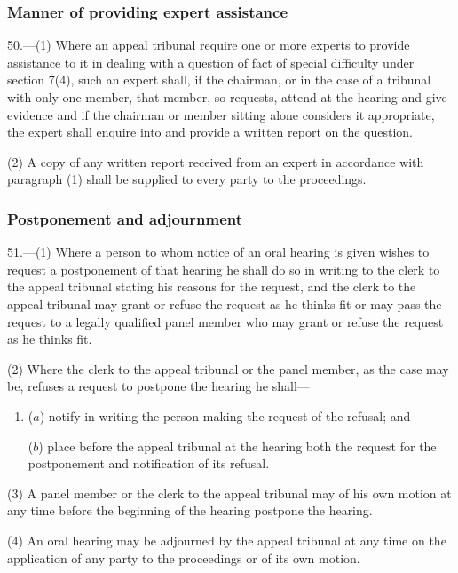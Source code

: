 \documentclass[12pt,a4paper]{article}
\begin{document}
\subsubsection[50. Manner of providing expert assistance]{Manner of providing expert assistance}

50.—(1) Where an appeal tribunal require one or more experts to provide assistance to it in dealing with a question of fact of special difficulty under section 7(4), such an expert shall, if the chairman, or in the case of a tribunal with only one member, that member, so requests, attend at the hearing and give evidence and if the chairman or member sitting alone considers it appropriate, the expert shall enquire into and provide a written report on the question.

(2) A copy of any written report received from an expert in accordance with paragraph (1) shall be supplied to every party to the proceedings.

\subsubsection[51. Postponement and adjournment]{Postponement and adjournment}

51.—(1) Where a person to whom notice of an oral hearing is given wishes to request a postponement of that hearing he shall do so in writing to the clerk to the appeal tribunal stating his reasons for the request, and the clerk to the appeal tribunal may grant or refuse the request as he thinks fit or may pass the request to a legally qualified panel member who may grant or refuse the request as he thinks fit.

(2) Where the clerk to the appeal tribunal or the panel member, as the case may be, refuses a request to postpone the hearing he shall—
\begin{enumerate}\item[]
($a$) notify in writing the person making the request of the refusal; and

($b$) place before the appeal tribunal at the hearing both the request for the postponement and notification of its refusal.
\end{enumerate}

(3) A panel member or the clerk to the appeal tribunal may of his own motion at any time before the beginning of the hearing postpone the hearing.

(4) An oral hearing may be adjourned by the appeal tribunal at any time on the application of any party to the proceedings or of its own motion.
\end{document}
